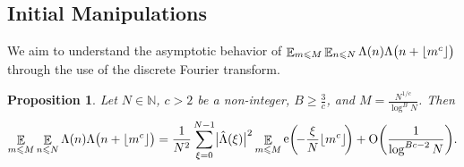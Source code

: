 \documentclass[letterpaper, 12pt]{article}
\theoremstyle{plain}
\newtheorem{Proposition}[Theorem]{Proposition}
\theoremstyle{definition}
\theoremstyle{plain}
\theoremstyle{plain}
\numberwithin{equation}{section}
\newcommand{\Oh}{{\rm O}}
\newcommand{\N}{\mathbb{N}}
\renewcommand{\leq}{\leqslant}
\renewcommand{\geq}{\geqslant}
\newcommand{\E}{\mathbb{E}}
\newcommand{\1}{\textbf{1}}
\DeclarePairedDelimiter\floor{\lfloor}{\rfloor}
\DeclareMathOperator{\e}{e}
\begin{document}
\subsection{Initial Manipulations}
We aim to understand the asymptotic behavior of \(\mathop{\E}_{m \leq M} \mathop{\E}_{n \leq N} \Lambda(n) \Lambda\bigl(n + \floor{m^c} \bigr)\) through the use of the discrete Fourier transform. 

\begin{Proposition}\label{prop:fourier-transform} 
Let $N\in \N$, $c > 2$ be a non-integer, $B \geq \frac{3}{c}$, and $M = \frac{N^{1/c}}{\log^{B} N}$. Then
    \[
        \mathop{\E}_{m \leq M} \mathop{\E}_{n \leq N} \Lambda(n) \Lambda\bigl(n + \floor{m^c} \bigr) 
        = \frac{1}{N^2} \sum_{\xi = 0}^{N - 1} \bigl\lvert \hat{\Lambda}(\xi) \bigr\rvert^2 \mathop{\E}_{m \leq M} \e\biggl(\! -\frac{\xi}{N} \floor{m^c} \!\biggr) + \Oh \biggl(\frac{1}{\log^{Bc-2}{N}}\biggr).
    \]
\end{Proposition}
\end{document}
